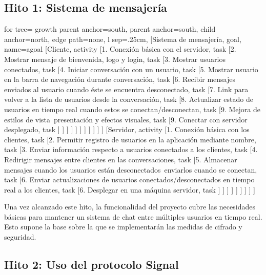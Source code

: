 \subsection{Hito 1: Sistema de mensajería}
\begin{adjustbox}{margin=2.5ex 5ex 2.5ex 2.5ex,center}
	\begin{forest} for tree={
	    growth parent anchor=south,
	    parent anchor=south,
	    child anchor=north,
	    edge path={none}, 
	    l sep=.25cm,
	}   
	[Sistema de mensajería, goal, name=agoal
	    [Cliente, activity
	        [1. Conexión básica con el servidor, task
	       	[2. Mostrar mensaje de bienvenida{,} logo y login, task
	        [3. Mostrar usuarios conectados, task
	        [4. Iniciar conversación con un usuario, task
			[5. Mostrar usuario en la barra de navegación durante conversación, task
			[6. Recibir mensajes enviados al usuario cuando éste se encuentra desconectado, task			
	        [7. Link para volver a la lista de usuarios desde la conversación, task
	        [8. Actualizar estado de usuarios en tiempo real cuando estos se conectan/desconectan, task
	        [9. Mejora de estilos de vista\, presentación y efectos visuales, task	        
	        [9. Conectar con servidor desplegado, task	  	        
	        ] ] ] ] ] ] ] ] ] ] ]
	    [Servidor, activity
	        [1. Conexión básica con los clientes, task
			[2. Permitir registro de usuarios en la aplicación mediante nombre, task
	        [3. Enviar información respecto a usuarios conectados a los clientes, task
	        [4. Redirigir mensajes entre clientes en las conversaciones, task
	        [5. Almacenar mensajes cuando los usuarios están desconectados\, enviarlos cuando se conectan, task
	        [6. Enviar actualizaciones de usuarios conectados/desconectados en tiempo real a los clientes, task
 	        [6. Desplegar en una máquina servidor, task
	        ] ] ] ] ] ] ] ] ]
	\end{forest}
\end{adjustbox}

Una vez alcanzado este hito, la funcionalidad del proyecto cubre las necesidades básicas para mantener un sistema de chat entre múltiples usuarios en tiempo real. Esto supone la base sobre la que se implementarán las medidas de cifrado y seguridad.
	
\subsection{Hito 2: Uso del protocolo Signal}

